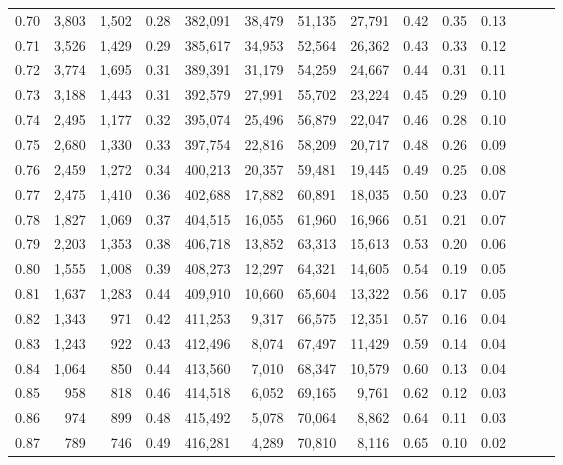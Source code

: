 \begin{tabular}{rrrrrrrrrrrrrr}
0.70 &   3,803 &  1,502 &  0.28 &  382,091 &   38,479 &  51,135 &  27,791 &  0.42 &  0.35 &      0.13 \\
0.71 &   3,526 &  1,429 &  0.29 &  385,617 &   34,953 &  52,564 &  26,362 &  0.43 &  0.33 &      0.12 \\
0.72 &   3,774 &  1,695 &  0.31 &  389,391 &   31,179 &  54,259 &  24,667 &  0.44 &  0.31 &      0.11 \\
0.73 &   3,188 &  1,443 &  0.31 &  392,579 &   27,991 &  55,702 &  23,224 &  0.45 &  0.29 &      0.10 \\
0.74 &   2,495 &  1,177 &  0.32 &  395,074 &   25,496 &  56,879 &  22,047 &  0.46 &  0.28 &      0.10 \\
0.75 &   2,680 &  1,330 &  0.33 &  397,754 &   22,816 &  58,209 &  20,717 &  0.48 &  0.26 &      0.09 \\
0.76 &   2,459 &  1,272 &  0.34 &  400,213 &   20,357 &  59,481 &  19,445 &  0.49 &  0.25 &      0.08 \\
0.77 &   2,475 &  1,410 &  0.36 &  402,688 &   17,882 &  60,891 &  18,035 &  0.50 &  0.23 &      0.07 \\
0.78 &   1,827 &  1,069 &  0.37 &  404,515 &   16,055 &  61,960 &  16,966 &  0.51 &  0.21 &      0.07 \\
0.79 &   2,203 &  1,353 &  0.38 &  406,718 &   13,852 &  63,313 &  15,613 &  0.53 &  0.20 &      0.06 \\
0.80 &   1,555 &  1,008 &  0.39 &  408,273 &   12,297 &  64,321 &  14,605 &  0.54 &  0.19 &      0.05 \\
0.81 &   1,637 &  1,283 &  0.44 &  409,910 &   10,660 &  65,604 &  13,322 &  0.56 &  0.17 &      0.05 \\
0.82 &   1,343 &    971 &  0.42 &  411,253 &    9,317 &  66,575 &  12,351 &  0.57 &  0.16 &      0.04 \\
0.83 &   1,243 &    922 &  0.43 &  412,496 &    8,074 &  67,497 &  11,429 &  0.59 &  0.14 &      0.04 \\
0.84 &   1,064 &    850 &  0.44 &  413,560 &    7,010 &  68,347 &  10,579 &  0.60 &  0.13 &      0.04 \\
0.85 &     958 &    818 &  0.46 &  414,518 &    6,052 &  69,165 &   9,761 &  0.62 &  0.12 &      0.03 \\
0.86 &     974 &    899 &  0.48 &  415,492 &    5,078 &  70,064 &   8,862 &  0.64 &  0.11 &      0.03 \\
0.87 &     789 &    746 &  0.49 &  416,281 &    4,289 &  70,810 &   8,116 &  0.65 &  0.10 &      0.02 \\

\end{tabular}

